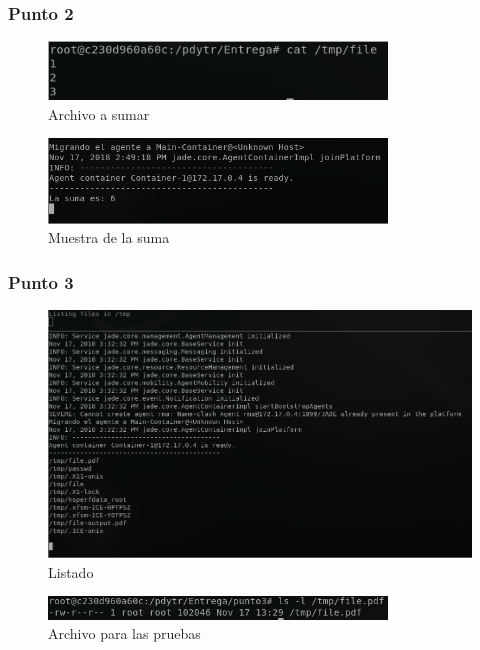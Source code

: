 \documentclass[12pt,journal,compsoc]{IEEEtran}
\begin{document}
\subsubsection{Punto 2}
\label{section:cap-punto2}

\begin{figure}[H]
  \centering
  \label{fig:punto-2-archivo}
  \includegraphics[width=90mm]{images/punto-2/1-archivo.png}
  \caption{Archivo a sumar}
\end{figure}

\begin{figure}[H]
  \centering
  \label{fig:punto-2-ejecucion}
  \includegraphics[width=90mm]{images/punto-2/2-ejecucion.png}
  \caption{Muestra de la suma}
\end{figure}


\subsubsection{Punto 3}
\label{section:cap-punto3}

\begin{figure}[H]
  \centering
  \includegraphics[width=160mm]{images/punto-3/list/1-list.png}
  \caption{Listado}
  \label{fig:list}
\end{figure}

\begin{figure}[H]
  \centering
  \label{fig:initial-file}
  \includegraphics[width=90mm]{images/punto-3/1-initial-file.png}
  \caption{Archivo para las pruebas}
\end{figure}
\end{document}
